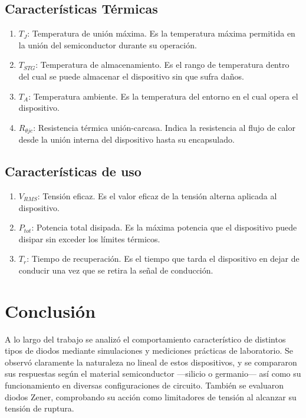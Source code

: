 \documentclass[chaptersright]{informeutn}
\begin{document}
  \section*{Características Térmicas}
  
    \begin{enumerate}
        \item $T_J$: Temperatura de unión máxima. Es la temperatura máxima permitida en la unión del semiconductor durante su operación.
        \item $T_{STG}$: Temperatura de almacenamiento. Es el rango de temperatura dentro del cual se puede almacenar el dispositivo sin que sufra daños.
        \item $T_A$: Temperatura ambiente. Es la temperatura del entorno en el cual opera el dispositivo.
        \item $R_{\theta jc}$: Resistencia térmica unión-carcasa. Indica la resistencia al flujo de calor desde la unión interna del dispositivo hasta su encapsulado.
    \end{enumerate}
  
  \section*{Características de uso}
  
    \begin{enumerate}
        \item $V_{RMS}$: Tensión eficaz. Es el valor eficaz de la tensión alterna aplicada al dispositivo.
        \item $P_{tot}$: Potencia total disipada. Es la máxima potencia que el dispositivo puede disipar sin exceder los límites térmicos.
        \item $T_r$: Tiempo de recuperación. Es el tiempo que tarda el dispositivo en dejar de conducir una vez que se retira la señal de conducción.
    \end{enumerate}

  \chapter{Conclusión}

    A lo largo del trabajo se analizó el comportamiento característico de distintos tipos de diodos mediante simulaciones y mediciones prácticas de laboratorio. Se observó claramente la naturaleza no lineal de estos dispositivos, y se compararon sus respuestas según el material semiconductor —silicio o germanio— así como su funcionamiento en diversas configuraciones de circuito. También se evaluaron diodos Zener, comprobando su acción como limitadores de tensión al alcanzar su tensión de ruptura.
\end{document}
